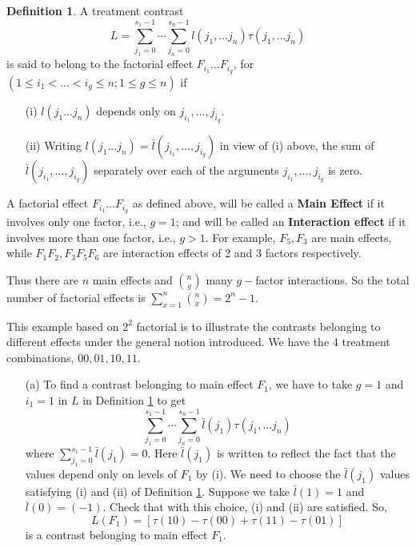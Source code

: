\documentclass[12pt]{article}
\theoremstyle{definition}
\newtheorem{defn}{Definition}
\newenvironment{definition}{
\begin{tcolorbox}[colback=green!5!white,colframe=green!75!black, parbox = false]\begin{defn} }{\end{defn}\end{tcolorbox} }
\newenvironment{example}[1][\unskip]{
\begin{tcolorbox}[colback=blue!5!white,colframe=blue!75!black, title = {Example #1}, parbox = false] }{\end{tcolorbox} }
\begin{document}
\begin{definition}
    A treatment contrast
    $$L = \sum_{j_1=0}^{s_1-1} \cdots \sum_{j_n=0}^{s_n-1} l(j_1, \ldots j_n) \tau(j_1, \ldots j_n) $$
    is said to belong to the factorial effect $F_{i_1}\ldots F_{i_g}$, for $(1 \leq i_1 < \dots < i_g \leq n; 1\leq g \leq n)$ if
    
    \begin{enumerate}
        \item[(i)] $l(j_1 . . . j_n)$ depends only on $j_{i_1}, \ldots, j_{i_g}$.
        \item[(ii)] Writing $l(j_1 . . . j_n) = \bar{l}(j_{i_1}, \ldots, j_{i_g} )$ in view of (i) above, the sum of $\bar{l}(j_{i_1}, \ldots, j_{i_g} )$ separately over each of the arguments $j_{i_1}, \ldots, j_{i_g} $ is zero.
    \end{enumerate}
    \label{defn:contrast-factorial-effect}
\end{definition}


A factorial effect  $F_{i_1} \ldots F_{i_g} $ as defined above, will be called a \textbf{Main Effect} if it involves only one factor, i.e., $ g=1$; and will be called an \textbf{Interaction effect} if it involves more than one factor, i.e., $g > 1$. For example, $F_5, F_3$ are main effects, while $F_1F_2,  F_3F_5F_6$  are interaction effects of 2 and 3 factors respectively.  

Thus there are $n$ main effects and $\displaystyle \binom{n}{g}$ many $g-$factor interactions. So the total number of factorial effects is $\displaystyle \sum_{x=1}^n \binom{n}{x}  = 2^n-1$.

\begin{example}
    This example based on $2^2$ factorial is to illustrate the contrasts belonging to different effects under the general notion introduced.
    We have the 4 treatment combinations, $00, 01, 10, 11$.
    
    \begin{enumerate}
        \item[(a)]     To find a contrast belonging to main effect $F_1$, we have to take $g=1$ and $i_1=1$ in  $L$ in  Definition \ref{defn:contrast-factorial-effect} to get 
    $$\sum_{j_1=0}^{s_1-1} \cdots \sum_{j_n=0}^{s_n-1} \bar{l}(j_1) \tau(j_1, \ldots j_n) $$
    where $\sum_{j_1=0}^{s_1-1} \bar{l} (j_1) =0$. Here $\bar{l}(j_1)$ is written to reflect the fact that the values depend only on levels of $F_1$ by (i). We need to choose the $\bar{l}(j_1)$ values  satisfying (i) and (ii) of Definition \ref{defn:contrast-factorial-effect}.
    Suppose we take $\bar{l}(1)=1$ and $\bar{l}(0)=(-1)$.  Check that with this choice, (i) and (ii) are satisfied. So,
    $$L(F_1) = [\tau(10) - \tau(00) + \tau(11)-\tau(01)]$$ is a contrast belonging to main effect $F_1$.
    \end{enumerate}
\end{example}
\end{document}
